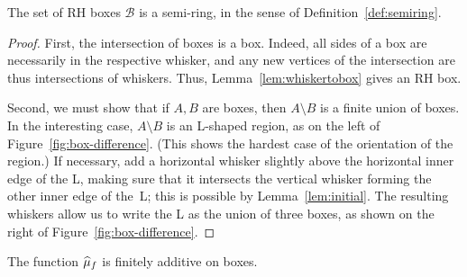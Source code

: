   \begin{figure}
\end{figure}

\begin{proposition}
  \label{prop:RHsemiring}
  The set of RH boxes $\mathcal{B}$ is a semi-ring, in the sense of Definition~\ref{def:semiring}.
\end{proposition}

\begin{proof}
  First, the intersection of boxes is a box. Indeed, all sides of a box are necessarily in the respective whisker, and any new vertices of the intersection are thus intersections of whiskers. Thus, Lemma~\ref{lem:whiskertobox} gives an RH box.

  Second, we must show that if $A,B$ are boxes, then $A \setminus B$ is a finite union of boxes. In the interesting case, $A\setminus B$ is an L-shaped region, as on the left of Figure~\ref{fig:box-difference}. (This shows the hardest case of the orientation of the region.) If necessary, add a horizontal whisker slightly above the horizontal inner edge of the L, making sure that it intersects the vertical whisker forming the other inner edge of the~L; this is possible by Lemma~\ref{lem:initial}. The resulting whiskers allow us to write the L as the union of three boxes, as shown on the right of Figure~\ref{fig:box-difference}.
\end{proof}

\begin{proposition}
  \label{prop:finitely-additive}
  The function $\widehat{\mu}_f$ is finitely additive on boxes.
\end{proposition}


  \begin{figure}
\end{figure}


